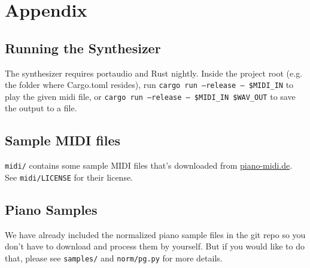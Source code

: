 \documentclass{article}
\begin{document}
\section{Appendix}

\subsection{Running the Synthesizer}

The synthesizer requires portaudio and Rust nightly. Inside the
project root (e.g. the folder where Cargo.toml resides), run
\texttt{cargo run --release -- \$MIDI\_IN}
to play the given midi file, or
\texttt{cargo run --release -- \$MIDI\_IN \$WAV\_OUT}
to save the output to a file.

\subsection{Sample MIDI files}

\texttt{midi/} contains some sample MIDI files that's downloaded from 
\href{http://www.piano-midi.de/}{piano-midi.de}. See \texttt{midi/LICENSE}
for their license.

\subsection{Piano Samples}

We have already included the normalized piano sample files in the git repo
so you don't have to download and process them by yourself. But if you would
like to do that, please see \texttt{samples/} and \texttt{norm/pg.py} for
more details.
\end{document}

